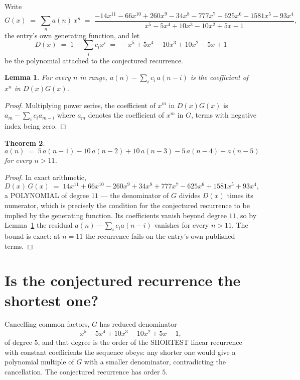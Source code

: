 \documentclass[11pt,a4paper]{article}
\theoremstyle{plain}
\newtheorem{theorem}{Theorem}
\newtheorem{lemma}[theorem]{Lemma}
\theoremstyle{definition}
\begin{document}
Write
\[
G(x)\;=\;\sum_{n}a(n)\,x^{n}\;=\;\frac{- 14 x^{11} - 66 x^{10} + 260 x^{9} - 34 x^{8} - 777 x^{7} + 625 x^{6} - 1581 x^{5} - 93 x^{4}}{x^{5} - 5 x^{4} + 10 x^{3} - 10 x^{2} + 5 x - 1},
\]
the entry's own generating function, and let
\[
D(x)\;=\;1-\sum_i c_i x^{i}\;=\;- x^{5} + 5 x^{4} - 10 x^{3} + 10 x^{2} - 5 x + 1
\]
be the polynomial attached to the conjectured recurrence.

\begin{lemma}\label{lem:key}
For every $n$ in range, $a(n)-\sum_i c_i\,a(n-i)$ is the coefficient of $x^{n}$ in
$D(x)G(x)$.
\end{lemma}

\begin{proof}
Multiplying power series, the coefficient of $x^{m}$ in $D(x)G(x)$ is
$a_m-\sum_i c_i a_{m-i}$ where $a_m$ denotes the coefficient of $x^{m}$ in $G$, terms with
negative index being zero.
\end{proof}

\begin{theorem}
\[
a(n)\;=\;5\,a(n-1) - 10\,a(n-2) + 10\,a(n-3) - 5\,a(n-4) + a(n-5)
\]
for every $n>11$.
\end{theorem}

\begin{proof}
In exact arithmetic,
\[
D(x)\,G(x)\;=\;14 x^{11} + 66 x^{10} - 260 x^{9} + 34 x^{8} + 777 x^{7} - 625 x^{6} + 1581 x^{5} + 93 x^{4},
\]
a POLYNOMIAL of degree $11$ --- the denominator of $G$ divides $D(x)$ times its numerator,
which is precisely the condition for the conjectured recurrence to be implied by the
generating function. Its coefficients vanish beyond degree $11$, so by
Lemma~\ref{lem:key} the residual $a(n)-\sum_ic_ia(n-i)$ vanishes for every
$n>11$. The bound is exact: at $n=11$ the recurrence fails on the entry's own published terms.
\end{proof}

\section{Is the conjectured recurrence the shortest one?}

Cancelling common factors, $G$ has reduced denominator
\[
x^{5} - 5 x^{4} + 10 x^{3} - 10 x^{2} + 5 x - 1,
\]
of degree $5$, and that degree is the order of the SHORTEST linear recurrence with
constant coefficients the sequence obeys: any shorter one would give a polynomial multiple of
$G$ with a smaller denominator, contradicting the cancellation. The conjectured recurrence has
order $5$.
\end{document}
